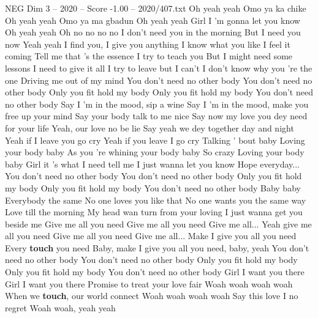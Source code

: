 \begin{textsample}{NEG Dim 3 – 2020 – Score -1.00 – 2020/407.txt}  \label{ex:f3_neg_036}
Oh yeah yeah Omo ya ka chike Oh yeah yeah Omo ya ma gbadun Oh yeah yeah Girl I 'm gonna let you know Oh yeah yeah Oh no no no no I don't need you in the morning But I need you now Yeah yeah I find you, I give you anything I know what you like I feel it coming Tell me that 's the essence I try to teach you But I might need some lessons I need to give it all I try to leave but I can't I don't know why you 're the one Driving me out of my mind You don't need no other body You don't need no other body Only you fit hold my body Only you fit hold my body You don't need no other body Say I 'm in the mood, sip a wine Say I 'm in the mood, make you free up your mind Say your body talk to me nice Say now my love you dey need for your life Yeah, our love no be lie Say yeah we dey together day and night Yeah if I leave you go cry Yeah if you leave I go cry Talking ' bout baby Loving your body baby As you 're whining your body baby So crazy Loving your body baby Girl it 's what I need tell me I just wanna let you know Hope everyday...
You don't need no other body You don't need no other body Only you fit hold my body Only you fit hold my body You don't need no other body Baby baby Everybody the same No one loves you like that No one wants you the same way Love till the morning My head wan turn from your loving I just wanna get you beside me Give me all you need Give me all you need Give me all...
Yeah give me all you need Give me all you need Give me all...
Make I give you all you need Every \textbf{touch} you need Baby, make I give you all you need, baby, yeah You don't need no other body You don't need no other body Only you fit hold my body Only you fit hold my body You don't need no other body Girl I want you there Girl I want you there Promise to treat your love fair Woah woah woah woah When we \textbf{touch}, our world connect Woah woah woah woah Say this love I no regret Woah woah, yeah yeah

\end{textsample}
